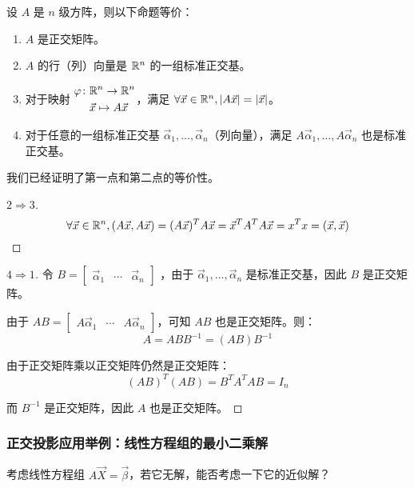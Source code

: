 \begin{theorem}
	设 $A$ 是 $n$ 级方阵，则以下命题等价：
	\begin{enumerate}
		\item $A$ 是正交矩阵。
		\item $A$ 的行（列）向量是 $\mathbb R^n$ 的一组标准正交基。
		\item 对于映射 $\begin{aligned} \varphi \colon & \mathbb R^n \to \mathbb R^n \\ & \vec x \mapsto A \vec x \end{aligned}$，满足 $\forall \vec x \in \mathbb R^n, |A \vec x| = |\vec x|$。
		\item 对于任意的一组标准正交基 $\vec \alpha_1, \ldots, \vec \alpha_n$（列向量），满足 $A \vec \alpha_1, \ldots, A \vec \alpha_n$ 也是标准正交基。
	\end{enumerate}
\end{theorem}

我们已经证明了第一点和第二点的等价性。

\begin{proof}[$2 \Longrightarrow 3$]
	$$
	\forall \vec x \in \mathbb R^n, (A \vec x, A \vec x) = (A\vec x)^T A \vec x = \vec x^T A^T A \vec x = x^T x = (\vec x, \vec x)
	$$
\end{proof}

\begin{proof}[$4 \Longrightarrow 1$]
	令 $B = \begin{bmatrix} \vec \alpha_1 & \cdots & \vec \alpha_n \end{bmatrix}$ ，由于 $\vec \alpha_1, \ldots, \vec \alpha_n$ 是标准正交基，因此 $B$ 是正交矩阵。

	由于 $AB = \begin{bmatrix} A \vec \alpha_1 & \cdots & A \vec \alpha_n \end{bmatrix}$，可知 $AB$ 也是正交矩阵。则：
	$$
	A = ABB^{-1} = (AB) B^{-1}
	$$

	由于正交矩阵乘以正交矩阵仍然是正交矩阵：
	$$
	(AB)^T(AB) = B^TA^TAB = I_n
	$$

	而 $B^{-1}$ 是正交矩阵，因此 $A$ 也是正交矩阵。
\end{proof}

\subsubsection{正交投影应用举例：线性方程组的最小二乘解}

考虑线性方程组 $A \vec X = \vec \beta$，若它无解，能否考虑一下它的近似解？

